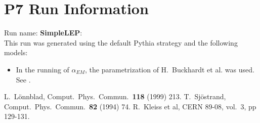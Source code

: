 \documentclass{article}
\begin{document}
\appendix
\section[xxx]{P\scalebox{0.8}{YTHIA}7\cite{Pythia7} Run Information}
Run name: \textbf{SimpleLEP}:\\
This run was generated using the default Pythia\cite{TS94Pythia} strategy and the following models:
\begin{itemize}
\item In the running of $\alpha_{EM}$, the parametrization of H.~Buckhardt et al. was used. See \cite{KLEISSCERN9808v3pp129}.
\end{itemize}

\begin{thebibliography}{99}
 L.~L\"onnblad, Comput.~Phys.~Commun.\ {\bf 118} (1999) 213.
 T.~Sj\"ostrand, Comput.~Phys.~Commun.\ {\bf 82} (1994) 74.
 R.~Kleiss et al, CERN 89-08, vol.~3, pp 129-131.
\end{thebibliography}
\end{document}
